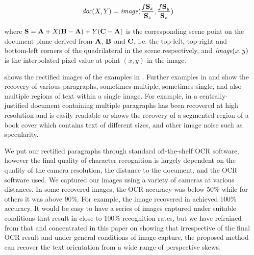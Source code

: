 \begin{equation}
\mbox{\em doc}(X,Y) = \mbox{\em image}(\frac{f{ \bf S }_x}{{ \bf S }_z},\frac{f{ \bf S }_y}{{ \bf S }_z})
\end{equation}


where
${ \bf S } = { \bf A } + X ( { \bf B }-{ \bf A } ) + Y ( { \bf C }-{ \bf A } )$
is the corresponding scene point on the document plane
derived from ${ \bf A }$, ${ \bf B }$ and ${ \bf C }$, i.e. the top-left, top-right and bottom-left corners of the
quadrilateral in the scene 
respectively, and $\mbox{\em image}(x,y)$ is the interpolated pixel value at point $(x,y)$ in the image.


 shows the rectified images of the examples in
. Further examples in  and 
 show the recovery of various paragraphs, sometimes
multiple, sometimes single, and also multiple regions of text within a single image. 
For example, in  a centrally-justified document containing
multiple paragraphs has been recovered at high resolution and is easily readable
or  shows the recovery of a segmented region of a book cover
which contains text of different sizes, and other image noise such as specularity.

We put our rectified paragraphs through standard off-the-shelf OCR software,
however the final quality of character recognition is largely dependent on the quality of
the camera resolution, the distance to the document, and the OCR software used. 
We captured our images using a variety of cameras at various distances. 
In some recovered images, the OCR accuracy was below 50\%
while for others it was above 90\%.  For example, the image recovered in
 achieved 100\% accuracy.
It would be easy to have a series of images captured under suitable conditions
that result in close to 100\% recognition rates, but we have refrained from that 
and concentrated in this paper on showing that irrespective of the final OCR
result and under general conditions of image capture, the proposed method can recover the
text orientation from a wide range of perspective skews.  


